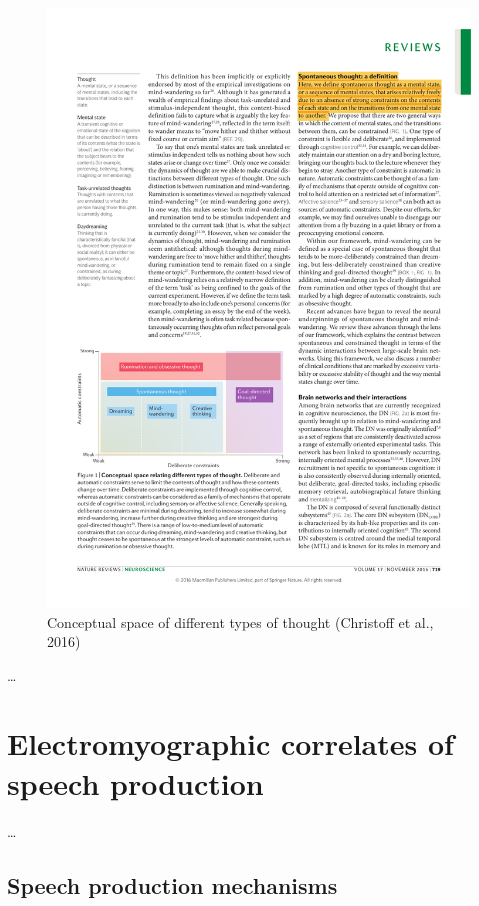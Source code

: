 \documentclass[12pt,]{book}
\begin{document}
\begin{figure}

{\centering \includegraphics{assets/conceptual_space} 

}

\caption{Conceptual space of different types of thought (Christoff et al., 2016)}\label{fig:unnamed-chunk-1}
\end{figure}

\ldots{}

\chapter{Electromyographic correlates of speech
production}\label{electromyographic-correlates-of-speech-production}

\ldots{}

\section{Speech production
mechanisms}\label{speech-production-mechanisms}
\end{document}
